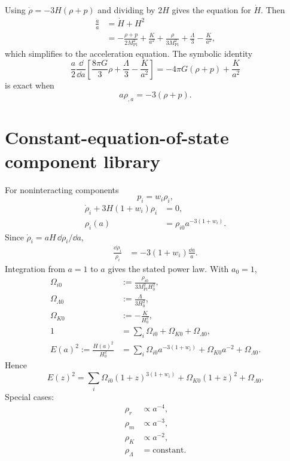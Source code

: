 Using \(\dot\rho=-3H(\rho+p)\) and dividing by \(2H\) gives the equation for \(\dot H\).  Then
\begin{align}
\frac{\ddot a}{a}
&=\dot H+H^2\\
&=
-\frac{\rho+p}{2M_{\mathrm{Pl}}^2}
+\frac{K}{a^2}
+\frac{\rho}{3M_{\mathrm{Pl}}^2}
+\frac{\Lambda}{3}
-\frac{K}{a^2},
\end{align}
which simplifies to the acceleration equation.
The symbolic identity
\begin{equation}
\frac{a}{2}\frac{\dd}{\dd a}
\left[
\frac{8\pi G}{3}\rho+\frac{\Lambda}{3}-\frac{K}{a^2}
\right]
=-4\pi G(\rho+p)+\frac{K}{a^2}
\end{equation}
is exact when
\begin{equation}
a\rho_{,a}=-3(\rho+p).
\end{equation}

\section{Constant-equation-of-state component library}
For noninteracting components
\begin{equation}
p_i=w_i\rho_i,
\end{equation}
\begin{align}
\dot\rho_i+3H(1+w_i)\rho_i&=0,\\
\rho_i(a)&=\rho_{i0}a^{-3(1+w_i)}.
\end{align}
Since \(\dot\rho_i=aH\,\dd\rho_i/\dd a\),
\begin{align}
\frac{\dd\rho_i}{\rho_i}
&=-3(1+w_i)\frac{\dd a}{a}.
\end{align}
Integration from \(a=1\) to \(a\) gives the stated power law.
With \(a_0=1\),
\begin{align}
\Omega_{i0}&:=\frac{\rho_{i0}}{3M_{\mathrm{Pl}}^2H_0^2},\\
\Omega_{\Lambda0}&:=\frac{\Lambda}{3H_0^2},\\
\Omega_{K0}&:=-\frac{K}{H_0^2},\\
1&=\sum_i\Omega_{i0}+\Omega_{K0}+\Omega_{\Lambda0},\\
E(a)^2
:=\frac{H(a)^2}{H_0^2}
&=\sum_i\Omega_{i0}a^{-3(1+w_i)}
+\Omega_{K0}a^{-2}+\Omega_{\Lambda0}.
\end{align}
Hence
\begin{equation}
E(z)^2
=\sum_i\Omega_{i0}(1+z)^{3(1+w_i)}
+\Omega_{K0}(1+z)^2+\Omega_{\Lambda0}.
\end{equation}
Special cases:
\begin{align}
\rho_r&\propto a^{-4},\\
\rho_m&\propto a^{-3},\\
\rho_K&\propto a^{-2},\\
\rho_\Lambda&=\mathrm{constant}.
\end{align}

